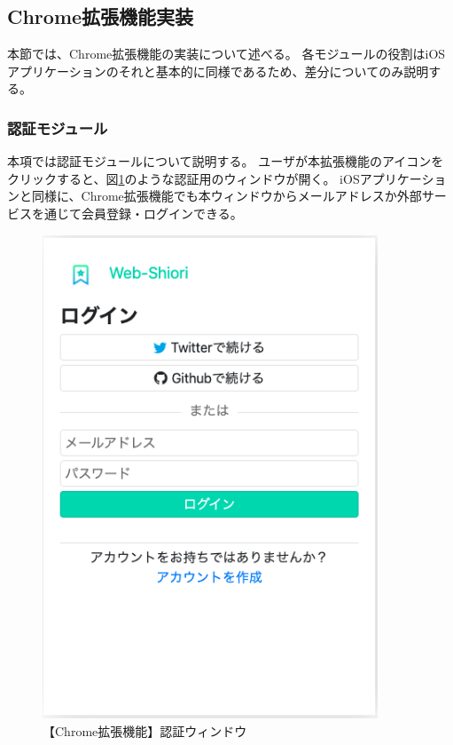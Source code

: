 
\subsection{Chrome拡張機能実装}
本節では、Chrome拡張機能の実装について述べる。
各モジュールの役割はiOSアプリケーションのそれと基本的に同様であるため、差分についてのみ説明する。

\subsubsection{認証モジュール}
本項では認証モジュールについて説明する。
ユーザが本拡張機能のアイコンをクリックすると、図\ref{fig:impl-chrome-auth-view}のような認証用のウィンドウが開く。
iOSアプリケーションと同様に、Chrome拡張機能でも本ウィンドウからメールアドレスか外部サービスを通じて会員登録・ログインできる。

\begin{figure}[htbp]
  \caption{【Chrome拡張機能】認証ウィンドウ}
  \label{fig:impl-chrome-auth-view}
  \begin{center}
    \includegraphics[bb=0 0 404 582,width=10cm]{img/050_implementation/chrome/impl-chrome-auth-view.pdf}
  \end{center}
\end{figure}

